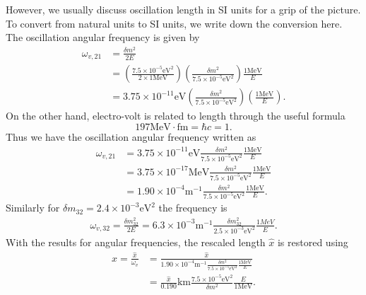 However, we usually discuss oscillation length in SI units for a grip of the picture. To convert from natural units to SI units, we write down the conversion here. The oscillation angular frequency is given by
\begin{align}
   \omega_{v,21} &= \frac{\delta m^2}{2E} \nonumber\\
   &=  \left(\frac{7.5\times 10^{-5}\mathrm{eV}^2}{2\times 1\mathrm{MeV}} \right) \left(\frac{\delta m^2}{7.5\times 10^{-5}\mathrm{eV}^2} \right) \frac{1\mathrm{MeV}}{E} \nonumber\\
   &= 3.75\times 10^{-11}\mathrm{eV}  \left(\frac{\delta m^2}{7.5\times 10^{-5}\mathrm{eV}^2}\right) \left(\frac{1\mathrm{MeV}}{E}\right) .
\end{align}
On the other hand, electro-volt is related to length through the useful formula
\begin{equation}
   197\mathrm{MeV}\cdot \mathrm{fm} = \hbar c = 1.
\end{equation}
Thus we have the oscillation angular frequency written as
\begin{align}
   \omega_{v,21} &= 3.75\times 10^{-11}\mathrm{eV}  \frac{\delta m^2}{7.5\times 10^{-5}\mathrm{eV}^2} \frac{1\mathrm{MeV}}{E} \nonumber\\
   &= 3.75\times 10^{-17}\mathrm{MeV}  \frac{\delta m^2}{7.5\times 10^{-5}\mathrm{eV}^2} \frac{1\mathrm{MeV}}{E}\nonumber \\
   &= 1.90\times 10^{-4}  \mathrm{m}^{-1}  \frac{\delta m^2}{7.5\times 10^{-5}\mathrm{eV}^2} \frac{1\mathrm{MeV}}{E}.
   \label{common-sense-eqn-omega-v-si-unit}
\end{align}
Similarly for $\delta m_{32}=2.4\times 10^{-3}\mathrm{eV^2}$ the frequency is
\begin{align}
   \omega_{v,32} =\frac{\delta m^2_{32}}{2E} = 6.3\times 10^{-3} \mathrm{m}^{-1}  \frac{\delta m^2_{32}}{2.5\times 10^{-3} \mathrm{eV}^2 } \frac{1MeV}{E}.
\end{align}
With the results for angular frequencies, the rescaled length $\hat x$ is restored using
\begin{align}
    x = \frac{\hat x}{\omega_v} &= \frac{\hat x}{  1.90\times 10^{-4}  \mathrm{m}^{-1}  \frac{\delta m^2}{7.5\times 10^{-5}\mathrm{eV}^2} \frac{1\mathrm{MeV}}{E} } \\
    &= \frac{\hat x}{0.190} \mathrm{km} \frac{7.5\times 10^{-5}\mathrm{eV}^2}{\delta m^2}  \frac{E}{1\mathrm{MeV}}.
\end{align}


